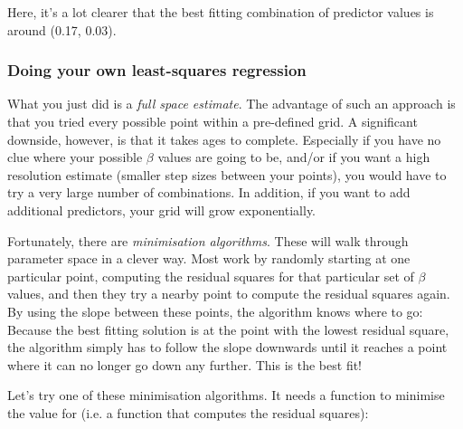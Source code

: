 \documentclass[11pt]{article}
\begin{document}
    Here, it's a lot clearer that the best fitting combination of predictor
values is around (0.17, 0.03).

    \subsubsection{Doing your own least-squares
regression}\label{doing-your-own-least-squares-regression}

What you just did is a \emph{full space estimate}. The advantage of such
an approach is that you tried every possible point within a pre-defined
grid. A significant downside, however, is that it takes ages to
complete. Especially if you have no clue where your possible \(\beta\)
values are going to be, and/or if you want a high resolution estimate
(smaller step sizes between your points), you would have to try a very
large number of combinations. In addition, if you want to add additional
predictors, your grid will grow exponentially.

Fortunately, there are \emph{minimisation algorithms}. These will walk
through parameter space in a clever way. Most work by randomly starting
at one particular point, computing the residual squares for that
particular set of \(\beta\) values, and then they try a nearby point to
compute the residual squares again. By using the slope between these
points, the algorithm knows where to go: Because the best fitting
solution is at the point with the lowest residual square, the algorithm
simply has to follow the slope downwards until it reaches a point where
it can no longer go down any further. This is the best fit!

Let's try one of these minimisation algorithms. It needs a function to
minimise the value for (i.e. a function that computes the residual
squares):
\end{document}
